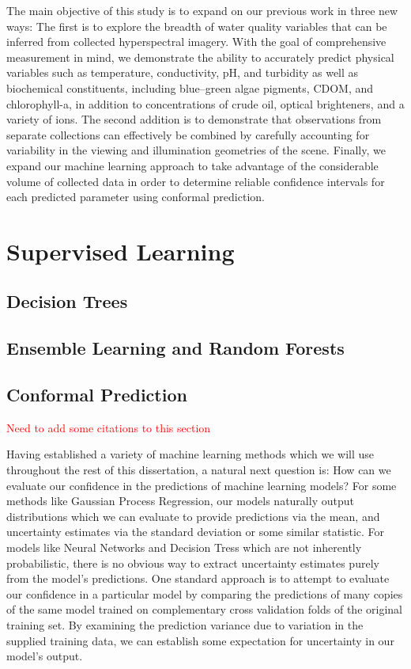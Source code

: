 The main objective of this study is to expand on our previous work in three new
ways: The first is to explore the breadth of water quality variables that can be
inferred from collected hyperspectral imagery. With the goal of comprehensive
measurement in mind, we demonstrate the ability to accurately predict physical
variables such as temperature, conductivity, pH, and turbidity as well as
biochemical constituents, including blue--green algae pigments, CDOM, and
chlorophyll-a, in addition to concentrations of crude oil, optical brighteners,
and a variety of ions. The second addition is to demonstrate that observations
from separate collections can effectively be combined by carefully accounting
for variability in the viewing and illumination geometries of the scene.
Finally, we expand our machine learning approach to take advantage of the
considerable volume of collected data in order to determine reliable confidence
intervals for each predicted parameter using conformal prediction.

\section{Supervised Learning}

\subsection{Decision Trees}


\subsection{Ensemble Learning and Random Forests}


\subsection{Conformal Prediction}


\textcolor{red}{Need to add some citations to this section}

Having established a variety of machine learning methods which we will use
throughout the rest of this dissertation, a natural next question is: How can we
evaluate our confidence in the predictions of machine learning models? For some
methods like Gaussian Process Regression, our models naturally output
distributions which we can evaluate to provide predictions via the mean, and
uncertainty estimates via the standard deviation or some similar statistic. For
models like Neural Networks and Decision Tress which are not inherently
probabilistic, there is no obvious way to extract uncertainty estimates purely
from the model's predictions. One standard approach is to attempt to evaluate
our confidence in a particular model by comparing the predictions of many copies
of the same model trained on complementary cross validation folds of the
original training set. By examining the prediction variance due to variation in
the supplied training data, we can establish some expectation for uncertainty in
our model's output.


